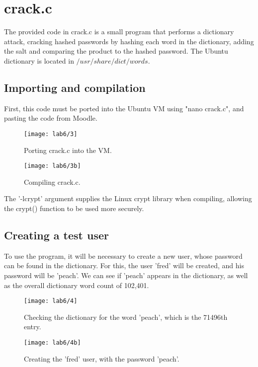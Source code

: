 \section{crack.c}\label{sec:crack.c}
The provided code in crack.c is a small program that performs a dictionary attack,
cracking hashed passwords by hashing each word in the dictionary, adding the salt
and comparing the product to the hashed password.
The Ubuntu dictionary is located in $/usr/share/dict/words$.

\subsection{Importing and compilation}\label{subsec:importing-and-compilation}
First, this code must be ported into the Ubuntu VM using "nano crack.c", and pasting the code from Moodle.

\begin{figure}[H]
    \centering
    \texttt{[image: lab6/3]}
    \caption{Porting crack.c into the VM.}
    \label{fig:nanoCrackC}
\end{figure}

\begin{figure}[H]
    \centering
    \texttt{[image: lab6/3b]}
    \caption{Compiling crack.c.}
    \label{fig:compile}
\end{figure}

The '-lcrypt' argument supplies the Linux crypt library when compiling, allowing the crypt() function
to be used more securely.

\pagebreak

\subsection{Creating a test user}\label{subsec:creating-a-test-user}
To use the program, it will be necessary to create a new user, whose password can be found in the dictionary.
For this, the user 'fred' will be created, and his password will be 'peach'.
We can see if 'peach' appears in the dictionary, as well as the overall dictionary word count of 102,401.

\begin{figure}[H]
    \centering
    \texttt{[image: lab6/4]}
    \caption{Checking the dictionary for the word 'peach', which is the 71496th entry.}
    \label{fig:checkDict}
\end{figure}

\begin{figure}[H]
    \centering
    \texttt{[image: lab6/4b]}
    \caption{Creating the 'fred' user, with the password 'peach'.}
    \label{fig:createFred}
\end{figure}

